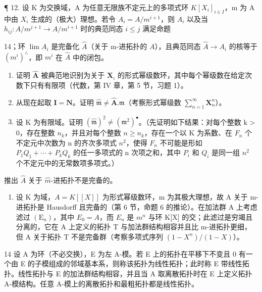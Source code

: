  ¶ 12. 设 K 为交换域，A 为任意无限族不定元上的多项式环 \(K[X_{i}]_{i\in I}\)，m 为 A 中由 \(X_{i}\) 生成的（极大）理想。若令 \(A_{i}=A/m^{i+1}\)，则 \(A_{i}\) 以及当 \(h_{ij}:A/m^{j+1}\to A/m^{i+1}\) 时的典范同态 \(i\leqslant j\) 满足命题

14；环 \(\lim A_{i}\) 是完备化 \(\hat{A}\)（关于 m-进拓扑的 \(A\)），且典范同态 \(\hat{A} \to A_{i}\) 的核等于 \((m^{i})^{\wedge}\)，即 \(m^{i}\) 在 \(\hat{A}\) 中的闭包。

\begin{enumerate}
\def\labelenumi{(\alph{enumi})}
\item
  证明 \(\hat{\mathbf{A}}\) 被典范地识别为关于 \(\mathbf{X}_{\iota}\) 的形式幂级数环，其中每个幂级数在给定次数下只有有限项（代数，第 IV 章，第 5 节，习题 1）。
\item
  从现在起取 \(\mathbf{I} = \mathbf{N}\)。证明 \(\hat{\mathfrak{m}} \neq \hat{\mathbf{A}}. \mathfrak{m}\)（考察形式幂级数 \(\sum_{n=1}^{\infty} \mathbf{X}_n^n\)）。
\item
  设 K 为有限域。证明 \((\hat{\mathfrak{m}})^{2} \neq (\mathfrak{m}^{2})^{\bullet}\)。（先证明如下结果：对每个整数 k \textgreater{} 0，存在整数 \(n_{k}\)，并且对每个整数 \(n \geqslant n_{k}\)，存在一个以 K 为系数、在 \(F_{n}\) 个不定元中次数为 n 的齐次多项式 \(n^{2}\)，使得 \(F_{n}\) 不可能是形如 \(P_{1}Q_{1} + \cdots + P_{k}Q_{k}\) 的任一多项式的 n 次项之和，其中 \(P_{i}\) 和 \(Q_{i}\) 是同一组 \(n^{2}\) 个不定元中的无常数项多项式。）
\end{enumerate}

推出 \(\hat{A}\) 关于 \(\hat{m}\)-进拓扑不是完备的。

\begin{enumerate}
\def\labelenumi{\arabic{enumi}.}
\setcounter{enumi}{12}
\tightlist
\item
  设 K 为域，\(A = K[[X]]\) 为形式幂级数环，m 为其极大理想，故 A 关于 m-进拓扑是 Hausdorff 且完备的（第 6 节，命题 6 的推论）。在加法群 A 上考虑滤过 \((\mathrm{E}_{n})\)，其中 \(E_{0} = A\)，而 \(E_{n}\) 是 \(m^{n}\) 与环 K{[}X{]} 的交；此滤过是穷竭且分离的，它在 A 上定义的拓扑 T 与加法群结构相容并且比 m-进拓扑更细，但 A 关于拓扑 T 不是完备群（考察多项式序列 \((1 - X^{n})/(1 - X)\)）。
\end{enumerate}

14 设 A 为环（不必交换），E 为左 A-模。若 E 上的拓扑在平移下不变且 0 有一个由 E 的子模组成的邻域基本系，则称该拓扑为线性拓扑；此时称 E 带线性拓扑。线性拓扑与 E 的加法群结构相容，并且当 A 取离散拓扑时在 E 上定义拓扑 A-模结构。任意 A-模上的离散拓扑和最粗拓扑都是线性拓扑。

